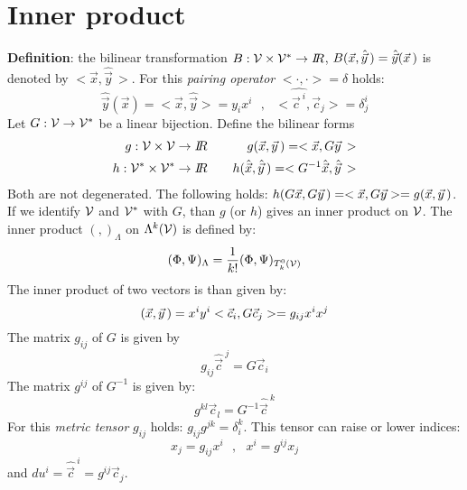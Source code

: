 \documentclass[a4paper,fancyheadings,twoside]{report}
\begin{document}
\section{Inner product}
{\bf Definition}: the bilinear transformation $B:{\cal V}\times{\cal V}^*\rightarrow I\hspace{-1mm}R$,
$B(\vec{x},\hat{\vec{y}}\,)=\hat{\vec{y}}(\vec{x}\,)$ is denoted by
$<\vec{x},\hat{\vec{y}}\,>$.
For this {\it pairing operator} $<\cdot,\cdot>=\delta$ holds:
\[
\hat{\vec{y}}(\vec{x})=<\vec{x},\hat{\vec{y}}>=y_ix^i~~~,~~~<\hat{\vec{c}^{~i}},\vec{c}_j>=\delta_j^i
\]
Let $G:{\cal V}\rightarrow{\cal V}^*$ be a linear bijection. Define the
bilinear forms
\begin{eqnarray*}
g:{\cal V\times V}\rightarrow I\hspace{-1mm}R&~~~&g(\vec{x},\vec{y}\,)=<\vec{x},G\vec{y}\,>\\
h:{\cal V^*\times V^*}\rightarrow I\hspace{-1mm}R&~~~&h(\hat{\vec{x}},\hat{\vec{y}}\,)=<G^{-1}\hat{\vec{x}},\hat{\vec{y}}\,>
\end{eqnarray*}
Both are not degenerated. The following holds: $h(G\vec{x},G\vec{y}\,)=<\vec{x},G\vec{y}>=g(\vec{x},\vec{y}\,)$.
If we identify $\cal V$ and $\cal V^*$ with $G$, than $g$ (or $h$)
gives an inner product on $\cal V$.
\npar
The inner product $(,)_\Lambda$ on $\Lambda^k(\cal V)$ is defined by:
\[
(\Phi,\Psi)_\Lambda=\frac{1}{k!}(\Phi,\Psi)_{T^0_k(\cal V)}
\]
The inner product of two vectors is than given by:
\[
(\vec{x},\vec{y}\,)=x^iy^i<\vec{c}_i,G\vec{c}_j>=g_{ij}x^ix^j
\]
The matrix $g_{ij}$ of $G$ is given by
\[
g_{ij}\hat{\vec{c}}^{~j}=G\vec{c}_i
\]
The matrix $g^{ij}$ of $G^{-1}$ is given by:
\[
g^{kl}\vec{c}_l=G^{-1}\hat{\vec{c}}^{~k}
\]
For this {\it metric tensor} $g_{ij}$ holds: $g_{ij}g^{jk}=\delta_i^k$.
This tensor can raise or lower indices:
\[
x_j=g_{ij}x^i~~~,~~~x^i=g^{ij}x_j
\]
and $du^i=\hat{\vec{c}}^{~i}=g^{ij}\vec{c}_j$.
\npar
\end{document}
